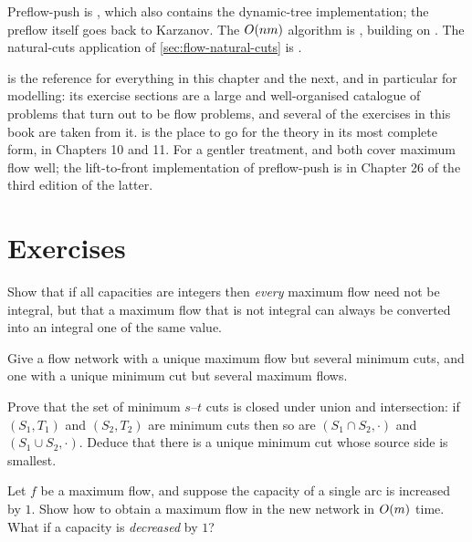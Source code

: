 Preflow-push is \citet{GoldbergTarjan1988}, which also contains the
dynamic-tree implementation; the preflow itself goes back to Karzanov. The
$O\!\left(nm\right)$ algorithm is \citet{Orlin2013}, building on
\citet{KingRaoTarjan1994}. The natural-cuts application of
\cref{sec:flow-natural-cuts} is \citet{DellingGoldbergRazenshteynWerneck2011}.

\citet{AhujaMagnantiOrlin1993} is the reference for everything in this chapter
and the next, and in particular for modelling: its exercise sections are a
large and well-organised catalogue of problems that turn out to be flow
problems, and several of the exercises in this book are taken from it.
\citet{Schrijver2003} is the place to go for the theory in its most complete
form, in Chapters 10 and 11. For a gentler treatment,
\citet[Chapter 7]{KleinbergTardos2005} and \citet[Chapter 24]{CLRS2022} both
cover maximum flow well; the lift-to-front implementation of preflow-push is in
Chapter 26 of the third edition of the latter.

\section{Exercises}
\label{sec:ex-max-flow}

\begin{exercise}
Show that if all capacities are integers then \emph{every} maximum flow need
not be integral, but that a maximum flow that is not integral can always be
converted into an integral one of the same value.
\end{exercise}

\begin{exercise}
Give a flow network with a unique maximum flow but several minimum cuts, and
one with a unique minimum cut but several maximum flows.
\end{exercise}

\begin{exercise}
Prove that the set of minimum $s$--$t$ cuts is closed under union and
intersection: if $(S_1,T_1)$ and $(S_2,T_2)$ are minimum cuts then so are
$(S_1 \cap S_2, \cdot)$ and $(S_1 \cup S_2, \cdot)$. Deduce that there is a
unique minimum cut whose source side is smallest.
\end{exercise}

\begin{exercise}
Let $f$ be a maximum flow, and suppose the capacity of a single arc is
increased by $1$. Show how to obtain a maximum flow in the new network in
$O\!\left(m\right)$ time. What if a capacity is \emph{decreased} by $1$?
\end{exercise}


